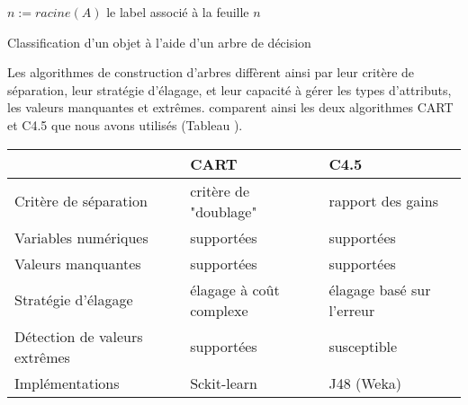 \begin{algorithm}[H] \small
	$n := racine(A)$ \; 
	\Return le label associé à la feuille $n$\;
	\caption{Classification d'un objet à l'aide d'un arbre de décision} \label{algo:sensresultat:classifywithtree}
\end{algorithm}

Les algorithmes de construction d'arbres diffèrent ainsi par leur critère de séparation, leur stratégie d'élagage, et leur capacité à gérer les types d'attributs, les valeurs manquantes et extrêmes. \citet{singh2014id3cartc45} comparent ainsi les deux algorithmes CART et C4.5 que nous avons utilisés (Tableau ).

\begin{table}
	\begin{tabular}{|p{3cm}|l|l|}
			\hline
	&	\textbf{CART} & \textbf{C4.5} \\ 
		\hline
		 Critère de séparation & critère de "doublage" & rapport des gains \\ 
		Variables numériques & supportées & supportées \\ 
		Valeurs manquantes & supportées & supportées \\  
		Stratégie d'élagage & élagage à coût complexe & élagage basé sur l'erreur \\  
		Détection de valeurs extrêmes & supportées & susceptible \\  
		Implémentations & Sckit-learn & J48 (Weka) \\ \hline
	\end{tabular}
\end{table}

